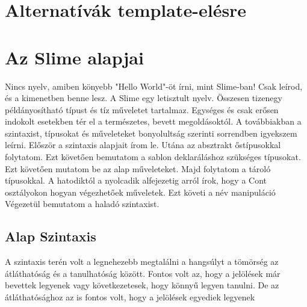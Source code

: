 \section{Alternatívák template-elésre }


\section{Az Slime alapjai}
Nincs nyelv, amiben könyebb "Hello World"-öt írni, mint Slime-ban!
Csak leírod, és a kimenetben benne lesz.
A Slime egy letisztult nyelv. 
Összesen tizenegy példányosítható típust és tíz műveletet tartalmaz. 
Egységes és csak erősen indokolt esetekben tér el a természetes, bevett megoldásoktól.
A továbbiakban a szintaxist, típusokat és műveleteket bonyolultság szerinti sorrendben igyekszem leírni.
Először a szintaxis alapjait írom le.
Utána az absztrakt őstípusokkal folytatom.
Ezt követően bemutatom a sablon deklaráláshoz szükséges típusokat.
Ezt követően mutatom be az alap műveleteket.
Majd folytatom a tároló típusokkal.
A hatodiktól a nyolcadik alfejezetig arról írok, hogy a Cont osztályokon hogyan végezhetőek műveletek.
Ezt követi a név manipuláció
Végezetül bemutatom a haladó szintaxist.

  

\subsection{Alap Szintaxis}
A szintaxis terén volt a legnehezebb megtalálni a hangsúlyt a tömörség az átláthatóság és a tanulhatóság között. 
Fontos volt az, hogy a jelölések már bevettek legyenek vagy következetesek, hogy könnyű legyen tanulni. 
De az átláthatósághoz az is fontos volt, hogy a jelölések egyediek legyenek

